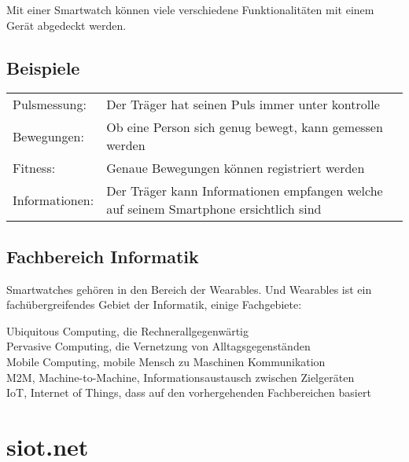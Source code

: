Mit einer Smartwatch können viele verschiedene Funktionalitäten mit einem Gerät abgedeckt werden.

\subsection{Beispiele}
\begin{tabular}{ll}
Pulsmessung: &	Der Träger hat seinen Puls immer unter kontrolle \\
Bewegungen:	& Ob eine Person sich genug bewegt, kann gemessen werden \\
Fitness: & Genaue Bewegungen können registriert werden \\
Informationen: & Der Träger kann Informationen empfangen welche auf seinem Smartphone ersichtlich sind
\end{tabular}

\subsection{Fachbereich Informatik}
Smartwatches gehören in den Bereich der Wearables. Und Wearables ist ein fachübergreifendes Gebiet der Informatik, einige Fachgebiete:

Ubiquitous Computing, die Rechnerallgegenwärtig \\
Pervasive Computing, die Vernetzung von Alltagsgegenständen \\
Mobile Computing, mobile Mensch zu Maschinen Kommunikation \\
M2M, Machine-to-Machine, Informationsaustausch zwischen Zielgeräten \\
IoT, Internet of Things, dass auf den vorhergehenden Fachbereichen basiert

\section{siot.net}
